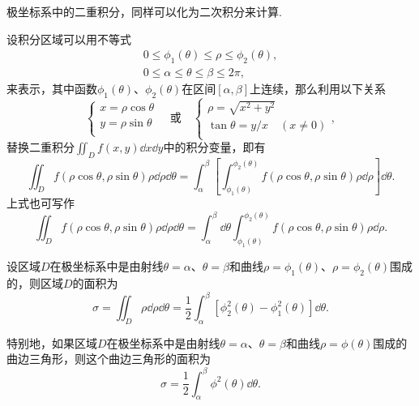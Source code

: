 极坐标系中的二重积分，同样可以化为二次积分来计算.
\begin{theorem}
设积分区域可以用不等式\begin{gather*}
0 \leq \phi_1(\theta) \leq \rho \leq \phi_2(\theta), \\
0 \leq \alpha \leq \theta \leq \beta \leq 2\pi,
\end{gather*}来表示，其中函数\(\phi_1(\theta)\)、\(\phi_2(\theta)\)在区间\([\alpha,\beta]\)上连续，那么利用以下关系\[
\left\{ \begin{array}{l}
x = \rho\cos\theta \\
y = \rho\sin\theta \\
\end{array} \right.
\quad\text{或}\quad
\left\{ \begin{array}{l}
\rho = \sqrt{x^2+y^2} \\
\tan\theta = y/x \quad (x \neq 0) \\
\end{array} \right.,
\]替换二重积分\(\iint_{D}{f(x,y)\dd{x}\dd{y}}\)中的积分变量，即有
\begin{equation}
\iint_D f(\rho\cos\theta,\rho\sin\theta) \rho \dd{\rho} \dd{\theta}
=\int_\alpha^\beta \left[
	\int_{\phi_1(\theta)}^{\phi_2(\theta)}
		f(\rho\cos\theta,\rho\sin\theta) \rho \dd{\rho} \right] \dd{\theta}.
\end{equation}
上式也可写作
\begin{equation}
\iint_D f(\rho\cos\theta,\rho\sin\theta) \rho \dd{\rho} \dd{\theta}
=\int_\alpha^\beta \dd{\theta}
	\int_{\phi_1(\theta)}^{\phi_2(\theta)}
		f(\rho\cos\theta,\rho\sin\theta) \rho \dd{\rho}.
\end{equation}
\end{theorem}

\begin{corollary}
设区域\(D\)在极坐标系中是由射线\(\theta=\alpha\)、\(\theta=\beta\)和曲线\(\rho=\phi_1(\theta)\)、\(\rho=\phi_2(\theta)\)围成的，则区域\(D\)的面积为
\begin{equation}
\sigma = \iint_D \rho \dd{\rho} \dd{\theta}
= \frac{1}{2} \int_\alpha^\beta [\phi_2^2(\theta) - \phi_1^2(\theta)] \dd{\theta}.
\end{equation}

特别地，如果区域\(D\)在极坐标系中是由射线\(\theta=\alpha\)、\(\theta=\beta\)和曲线\(\rho=\phi(\theta)\)围成的曲边三角形，则这个曲边三角形的面积为
\begin{equation}
\sigma = \frac{1}{2} \int_\alpha^\beta \phi^2(\theta) \dd{\theta}.
\end{equation}
\end{corollary}

